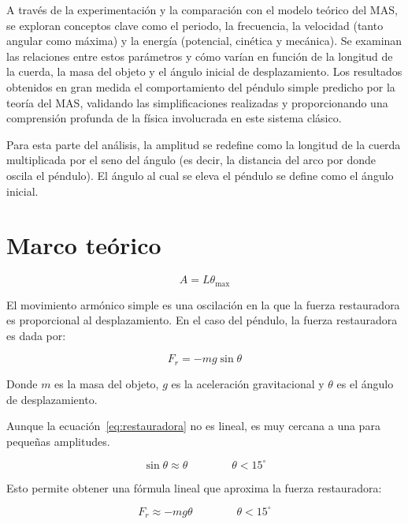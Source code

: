 \documentclass[letterpaper]{report}
\numberwithin{table}{section}
\begin{document}
A través de la experimentación y la comparación con el modelo teórico
del MAS, se exploran conceptos clave como el periodo, la frecuencia,
la velocidad (tanto angular como máxima) y la energía (potencial,
cinética y mecánica). Se examinan las relaciones entre estos
parámetros y cómo varían en función de la longitud de la cuerda, la
masa del objeto y el ángulo inicial de desplazamiento. Los resultados
obtenidos en gran medida el comportamiento del péndulo
simple predicho por la teoría del MAS, validando las simplificaciones
realizadas y proporcionando una comprensión profunda de la física
involucrada en este sistema clásico.

Para esta parte del análisis, la amplitud se redefine como la
longitud de la cuerda multiplicada por el seno del ángulo (es decir,
la distancia del arco por donde oscila el péndulo). El ángulo al cual
se eleva el péndulo se define como el ángulo inicial.

\section{Marco teórico}

\begin{equation}
  A = L\theta_{\max}
\end{equation}

El movimiento armónico simple es una oscilación en la que la fuerza restauradora
es proporcional al desplazamiento. En el caso del péndulo, la fuerza
restauradora es dada por:

\begin{equation}\label{eq:restauradora}
  F_{r} = -mg\sin{\theta}
\end{equation}

Donde $m$ es la masa del objeto, $g$ es la aceleración gravitacional y $\theta$
es el ángulo de desplazamiento.

Aunque la ecuación~\eqref{eq:restauradora} no es lineal, es muy cercana
a una para pequeñas amplitudes.

\begin{equation*}
  \sin{\theta} \approx \theta \qquad\qquad \theta < 15^{\circ}
\end{equation*}

Esto permite obtener una fórmula lineal que aproxima la fuerza restauradora:

\begin{equation}\label{eq:restauradora_aprox_por_alpha}
  F_{r} \approx -mg\theta \qquad\qquad \theta < 15^{\circ}
\end{equation}
\end{document}
